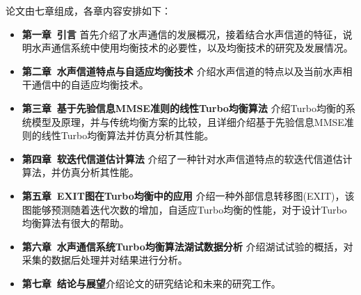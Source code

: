 论文由七章组成，各章内容安排如下：
\begin{itemize}
  \item \textbf{第一章~引言}\quad
    首先介绍了水声通信的发展概况，接着结合水声信道的特征，说明水声通信系统中使用均衡技术的必要性，以及均衡技术的研究及发展情况。
  \item \textbf{第二章~水声信道特点与自适应均衡技术}\quad
    介绍水声信道的特点以及当前水声相干通信中的自适应均衡技术。
  \item \textbf{第三章~基于先验信息MMSE准则的线性Turbo均衡算法}\quad
      介绍Turbo均衡的系统模型及原理，并与传统均衡方案的比较，且详细介绍基于先验信息MMSE准则的线性Turbo均衡算法并仿真分析其性能。
  \item \textbf{第四章~软迭代信道估计算法}\quad
    介绍了一种针对水声信道特点的软迭代信道估计算法，并仿真分析其性能。
  \item \textbf{第五章~EXIT图在Turbo均衡中的应用}\quad 
      介绍一种外部信息转移图(EXIT)，该图能够预测随着迭代次数的增加，自适应Turbo均衡的性能，对于设计Turbo均衡算法有很大的帮助。
  \item \textbf{第六章~水声通信系统Turbo均衡算法湖试数据分析}\quad 
      介绍湖试试验的概括，对采集的数据后处理并对结果进行分析。
  \item \textbf{第七章~结论与展望}\quad 介绍论文的研究结论和未来的研究工作。
\end{itemize}
